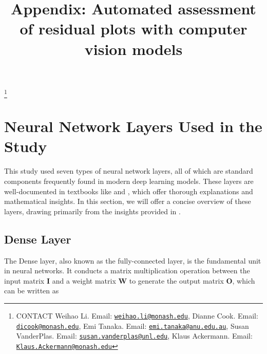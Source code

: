 \documentclass[]{interact}
\theoremstyle{plain}%
\theoremstyle{definition}
\theoremstyle{remark}
\begin{document}
\articletype{}

\title{Appendix: Automated assessment of residual plots with computer
vision models}


\author{
}

\thanks{CONTACT Weihao
Li. Email: \href{mailto:weihao.li@monash.edu}{\nolinkurl{weihao.li@monash.edu}}, Dianne
Cook. Email: \href{mailto:dicook@monash.edu}{\nolinkurl{dicook@monash.edu}}, Emi
Tanaka. Email: \href{mailto:emi.tanaka@anu.edu.au}{\nolinkurl{emi.tanaka@anu.edu.au}}, Susan
VanderPlas. Email: \href{mailto:susan.vanderplas@unl.edu}{\nolinkurl{susan.vanderplas@unl.edu}}, Klaus
Ackermann. Email: \href{mailto:Klaus.Ackermann@monash.edu}{\nolinkurl{Klaus.Ackermann@monash.edu}}}

\maketitle



\section{Neural Network Layers Used in the
Study}\label{neural-network-layers-used-in-the-study}

This study used seven types of neural network layers, all of which are
standard components frequently found in modern deep learning models.
These layers are well-documented in textbooks like
\citet{goodfellow2016deep} and \citet{chollet2021deep}, which offer
thorough explanations and mathematical insights. In this section, we
will offer a concise overview of these layers, drawing primarily from
the insights provided in \citet{goodfellow2016deep}.

\subsection{Dense Layer}\label{dense-layer}

The Dense layer, also known as the fully-connected layer, is the
fundamental unit in neural networks. It conducts a matrix multiplication
operation between the input matrix \(\boldsymbol{I}\) and a weight
matrix \(\boldsymbol{W}\) to generate the output matrix
\(\boldsymbol{O}\), which can be written as
\end{document}
